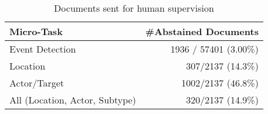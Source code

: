 \begin{table}[]
    \centering
    \small
    \begin{tabular}{l|r}
    \toprule
       \textbf{Micro-Task}  & \textbf{\#Abstained Documents} \\
    \midrule
       Event Detection &  1936 / 57401 (3.00\%) \\
       Location  & 307/2137 (14.3\%) \\
       Actor/Target & 1002/2137 (46.8\%) \\
       All (Location, Actor, Subtype) & 320/2137 (14.9\%) \\
    \bottomrule
    \end{tabular}
    \caption{Documents sent for human supervision}
    \label{tab:abstPerMicro}
\end{table}


